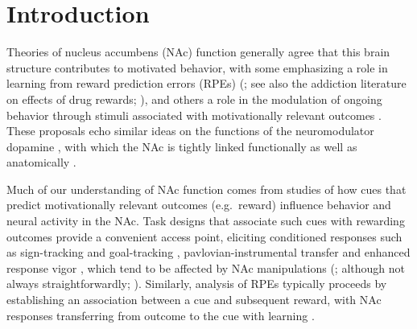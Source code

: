 \documentclass[11pt]{article}
\let\cite=\citep
\let\citeNP=\citealt
\begin{document}
\newpage

\section*{Introduction}

Theories of nucleus accumbens (NAc) function generally agree that this
brain structure contributes to motivated behavior, with some
emphasizing a role in learning from reward prediction errors (RPEs)
(\citeNP{Joel2002,Maia2009,Khamassi2012,Lee2012,Schultz2016,Averbeck2017};
see also the addiction literature on effects of drug rewards;
\citeNP{Kalivas2005,Hyman2006,Carelli2009}), and others a role in the
modulation of ongoing behavior through stimuli associated with
motivationally relevant outcomes \cite[invigorating,
  directing;][]{Nicola2010a,Salamone2012,Floresco2015}. These
proposals echo similar ideas on the functions of the neuromodulator
dopamine \cite{Maia2009,Berridge2012,Salamone2012,Schultz2016}, with
which the NAc is tightly linked functionally as well as anatomically
\cite{Cheer2007,Ikemoto2007,DuHoffmann2014,Takahashi2016}.

Much of our understanding of NAc function comes from studies of how
cues that predict motivationally relevant outcomes (e.g.\ reward)
influence behavior and neural activity in the NAc. Task designs that
associate such cues with rewarding outcomes provide a convenient
access point, eliciting conditioned responses such as sign-tracking and
goal-tracking \cite{hearst1974sign,Robinson2009},
pavlovian-instrumental transfer \cite{Estes1943,Rescorla1967} and
enhanced response vigor \cite{Niv2007,Nicola2010a}, which tend to be
affected by NAc manipulations
(\citeNP{Corbit2011,Flagel2011,Chang2012}; although not always
straightforwardly; \citeNP{Giertler2004,Chang2013}). Similarly,
analysis of RPEs typically proceeds by establishing an association
between a cue and subsequent reward, with NAc responses transferring
from outcome to the cue with learning
\cite{Schultz1997,Setlow2003,Roitman2005,Day2007a}.
\end{document}
